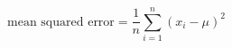 \documentclass{article}
\begin{document}
    \vfill
    \begin{center}
    \[
    \text{mean squared error} = \frac{1}{n} \sum_{i=1}^n (x_i - \mu)^2
    \]
    \end{center}
    \vfill
    
\end{document}
